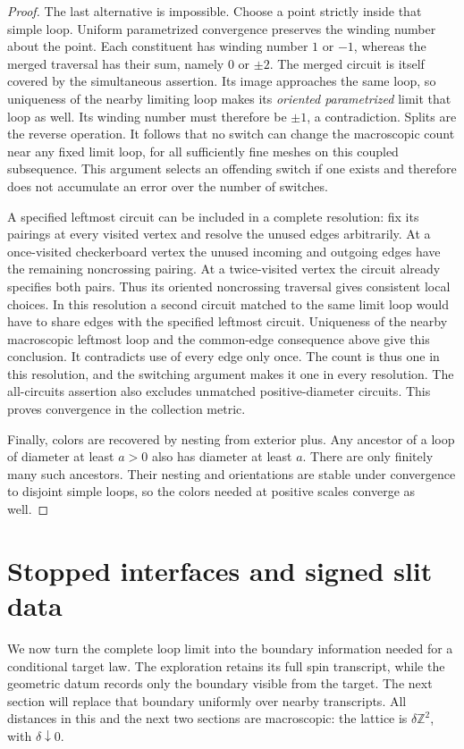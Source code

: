 \documentclass[11pt]{article}
\theoremstyle{definition}
\theoremstyle{remark}
\numberwithin{equation}{section}
\begin{document}
\begin{proof}
The last alternative is impossible.  Choose a point strictly inside
that simple loop.  Uniform parametrized convergence preserves the
winding number about the point.  Each constituent has winding number
$1$ or $-1$, whereas the merged traversal has their sum, namely $0$ or
$\pm2$. The merged circuit is itself covered by the simultaneous
assertion. Its image approaches the same loop, so uniqueness of the
nearby limiting loop makes its \emph{oriented parametrized} limit that
loop as well. Its winding number must therefore be $\pm1$, a
contradiction. Splits
are the reverse operation.  It follows that no switch can change the
macroscopic count near any fixed limit loop, for all sufficiently fine
meshes on this coupled subsequence.  This argument selects an offending
switch if one exists and therefore does not accumulate an error over
the number of switches.

A specified leftmost circuit can be included in a complete resolution:
fix its pairings at every visited vertex and resolve the unused edges
arbitrarily. At a once-visited checkerboard vertex the unused incoming
and outgoing edges have the remaining noncrossing pairing. At a
twice-visited vertex the circuit already specifies both pairs. Thus its
oriented noncrossing traversal gives consistent local choices. In this
resolution a second circuit
matched to the same limit loop would have to share edges with the
specified leftmost circuit.  Uniqueness of the nearby macroscopic
leftmost loop and the common-edge consequence above give this
conclusion.  It contradicts use of every edge only once.  The count is
thus one in this resolution, and the switching argument makes it one
in every resolution.  The all-circuits assertion also excludes
unmatched positive-diameter circuits.  This proves convergence in the
collection metric.

Finally, colors are recovered by nesting from exterior plus.  Any
ancestor of a loop of diameter at least $a>0$ also has diameter at least
$a$.  There are only finitely many such ancestors.  Their nesting and
orientations are stable under convergence to disjoint simple loops,
so the colors needed at positive scales converge as well.
\end{proof}

\section{Stopped interfaces and signed slit data}\label{if:section}

We now turn the complete loop limit into the boundary information needed
for a conditional target law. The exploration retains its full spin
transcript, while the geometric datum records only the boundary visible
from the target. The next section will replace that boundary uniformly
over nearby transcripts. All distances in this and the next two sections
are macroscopic: the lattice is $\delta\mathbb Z^2$, with
$\delta\downarrow0$.
\end{document}
